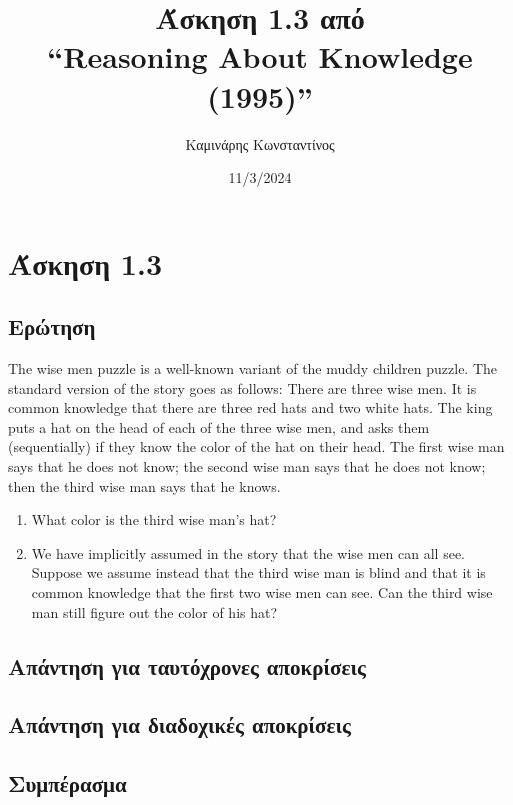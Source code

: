 \documentclass[12pt]{article}
\title{Άσκηση 1.3 από \\``Reasoning About Knowledge (1995)''}
\author{Καμινάρης Κωνσταντίνος}
\date{11/3/2024}
\begin{document}

\maketitle

\section*{Άσκηση 1.3}
\subsection*{Ερώτηση}
The wise men puzzle is a well-known variant of the muddy children puzzle.
The standard version of the story goes as follows: There are three wise men. It is
common knowledge that there are three red hats and two white hats. The king puts
a hat on the head of each of the three wise men, and asks them (sequentially) if they
know the color of the hat on their head. The first wise man says that he does not
know; the second wise man says that he does not know; then the third wise man says
that he knows.

\begin{enumerate}[label=\emph{\alph*}]
    \item What color is the third wise man’s hat?
    \item We have implicitly assumed in the story that the wise men can all see. Suppose we assume instead that the third wise man is blind and that it is common knowledge that the first two wise men can see. Can the third wise man still figure out the color of his hat?
\end{enumerate}

\newpage

\subsection*{Απάντηση για ταυτόχρονες αποκρίσεις}



\subsection*{Απάντηση για διαδοχικές αποκρίσεις}



\subsection*{Συμπέρασμα}


\end{document}
